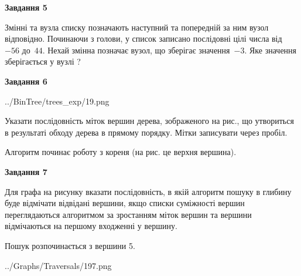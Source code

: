 \documentclass[12pt, ukrainian]{article}
\begin{document}
{\begin {large}
{\begin {center}\textbf{Завдання 5}\end {center}}\par
Змінні  та  вузла списку позначають наступний та попередній за ним вузол відповідно. Починаючи з голови, у список записано послідовні цілі числа від~$-56$ до~$44$. Нехай змінна  позначає вузол, що зберігає значення~$-3$.
Яке значення зберігається у вузлі  ?\par
\newpage

{\begin {center}\textbf{Завдання 6}\end {center}}\par

\begin{center}
	{../BinTree/trees_exp/19.png}
\end{center}
Указати послідовність міток вершин дерева, зображеного на рис., що утвориться в результаті обходу дерева в прямому порядку. Мітки записувати через пробіл.\par Алгоритм починає роботу з кореня (на рис. це верхня вершина).\par
\newpage

{\begin {center}\textbf{Завдання 7}\end {center}}\par
Для графа на рисунку вказати послідовність, в якій алгоритм пошуку в глибину буде відмічати відвідані вершини, якщо списки суміжності вершин переглядаються алгоритмом за зростанням міток вершин та вершини відмічаються на першому вход\-женні у вершину.\par
Пошук розпочинається з вершини 5.\par

\begin{center}
	{../Graphs/Traversals/197.png}
\end{center}\par
\newpage


\end{large}}
\end{document}
